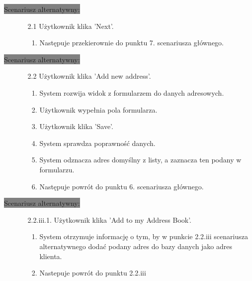 \documentclass[10pt]{report}
\begin{document}
			 
			\colorbox{grey}{Scenariusz alternatywny:}
			\begin{enumerate}\addtocounter{enumi}{2}
				\item[]
				\begin{enumerate}
					\item[2.1] Użytkownik klika 'Next'.
					\begin{enumerate}
						\item Następuje przekierownie do punktu 7. scenariusza głównego.
					\end{enumerate}
				\end{enumerate}
			\end{enumerate}

			\colorbox{grey}{Scenariusz alternatywny:}
			\begin{enumerate}\addtocounter{enumi}{2}
				\item[]
				\begin{enumerate}
					\item[2.2] Użytkownik klika 'Add new address'.
						\begin{enumerate}
							\item System rozwija widok z formularzem do danych adresowych.
							\item Użytkownik wypełnia pola formularza.
							\item Użytkownik klika 'Save'.
							\item System sprawdza poprawność danych.
							\item System odznacza adres domyślny z listy, a zaznacza ten podany w formularzu.
							\item Następuje powrót do punktu 6. scenariusza głównego.	
						\end{enumerate}
				\end{enumerate}
			\end{enumerate}

			\colorbox{grey}{Scenariusz alternatywny:}
			\begin{enumerate}\addtocounter{enumi}{2}
				\item[]
				\begin{enumerate}
					\item[2.2.iii.1.] Użytkownik klika 'Add to my Address Book'.
					\begin{enumerate}
						\item System otrzymuje informację o tym, by w punkcie 2.2.iii scenariusza alternatywnego dodać podany adres do bazy danych jako adres klienta.
						\item Nastepuje powrót do punktu 2.2.iii
					\end{enumerate}
				\end{enumerate}
			\end{enumerate}
	
\end{document}
